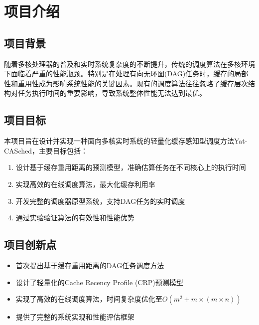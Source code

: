 
\section{项目介绍} \label{sec:intro}

\subsection{项目背景}

随着多核处理器的普及和实时系统复杂度的不断提升，传统的调度算法在多核环境下面临着严重的性能瓶颈。特别是在处理有向无环图(DAG)任务时，缓存的局部性和重用性成为影响系统性能的关键因素。现有的调度算法往往忽略了缓存层次结构对任务执行时间的重要影响，导致系统整体性能无法达到最优。

\subsection{项目目标}

本项目旨在设计并实现一种面向多核实时系统的轻量化缓存感知型调度方法Yat-CASched，主要目标包括：

\begin{enumerate}
    \item 设计基于缓存重用距离的预测模型，准确估算任务在不同核心上的执行时间
    \item 实现高效的在线调度算法，最大化缓存利用率
    \item 开发完整的调度器原型系统，支持DAG任务的实时调度
    \item 通过实验验证算法的有效性和性能优势
\end{enumerate}

\subsection{项目创新点}

\begin{itemize}
    \item 首次提出基于缓存重用距离的DAG任务调度方法
    \item 设计了轻量化的Cache Recency Profile (CRP)预测模型
    \item 实现了高效的在线调度算法，时间复杂度优化至$O(m^2 + m \times (m \times n))$
    \item 提供了完整的系统实现和性能评估框架
\end{itemize}
